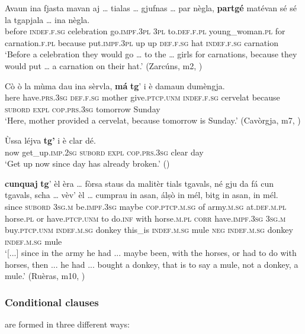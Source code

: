\ea
\label{ex:caus4}
\gll    Avaun ina fjasta mavan aj … tialas … gjufnas … par nègla, \textbf{partgé} matévan sé sé la tgapjala … ina nègla.\\
before \textsc{indef.f.sg} celebration go.\textsc{impf.3pl} \textsc{3pl} {} to.\textsc{def.f.pl} {}  young\_woman.\textsc{pl} {} for carnation.\textsc{f.pl} because put.\textsc{impf.3pl} up up  \textsc{def.f.sg} hat {} \textsc{indef.f.sg} carnation \\
\glt `Before a celebration they would go … to the … girls for carnations, because they would put … a carnation on their hat.' (Zarcúns, m2, )
\z

\ea
\label{ex:caus5}
\gll Cò ò la mùma dau ina sèrvla, \textbf{má} \textbf{tg}’ i è damaun dumèngja.\\
here have.\textsc{prs.3sg} \textsc{def.f.sg} mother give.\textsc{ptcp.unm} \textsc{indef.f.sg} cervelat because \textsc{subord} \textsc{expl} \textsc{cop.prs.3sg} tomorrow Sunday\\
\glt `Here, mother provided a cervelat, because tomorrow is Sunday.' (Cavòrgja, m7, )
\z

\ea
\label{ex:caus6}
\gll Ùssa léjva \textbf{tg'} i è clar dé.\\
  now get\_up.\textsc{imp.2sg} \textsc{subord} \textsc{expl} \textsc{cop.prs.3sg} clear day\\
\glt `Get up now since day has already broken.' ()
\z

\ea
\label{ex:caus7}
\gll [...] \textbf{cunquaj} \textbf{tg}' èl èra … fòrsa staus da malitèr tials tgavals, né gju da fá cun tgavals, scha … vèv’ èl … cumprau in asan, álṣò in mél, bitg in asan, in mél.\\
{} since \textsc{subord} \textsc{3sg.m} be.\textsc{impf.3sg} {} maybe \textsc{cop.ptcp.m.sg} of army.\textsc{m.sg} at.\textsc{def.m.pl} horse.\textsc{pl} or have.\textsc{ptcp.unm}  to do.\textsc{inf} with horse.\textsc{m.pl} \textsc{corr} {} have.\textsc{impf.3sg} \textsc{3sg.m} {}  buy.\textsc{ptcp.unm}  \textsc{indef.m.sg} donkey this\_is \textsc{indef.m.sg} mule \textsc{neg} \textsc{indef.m.sg} donkey \textsc{indef.m.sg} mule \\
\glt `[...] since in the army he had ... maybe been, with the horses, or had to do with horses, then ... he had ... bought a donkey, that is to say a mule, not a donkey, a mule.' (Ruèras, m10, )
\z

\subsubsection{Conditional clauses}\label{sec:6.2.2.5}
 are formed in three different ways:

